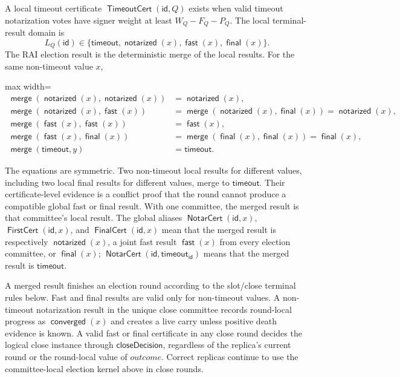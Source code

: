 \documentclass[sigplan,twocolumn,review,anonymous]{acmart}
\newcommand{\func}[1]{\operatorname{\mathsf{#1}}}
\newcommand{\NotarCert}{\func{NotarCert}}
\newcommand{\FirstCert}{\func{FirstCert}}
\newcommand{\FinalCert}{\func{FinalCert}}
\newcommand{\TimeoutCert}{\func{TimeoutCert}}
\newcommand{\id}{\mathsf{id}}
\newcommand{\closeDecision}{\mathsf{closeDecision}}
\newcommand{\timeoutVal}{\mathsf{timeout}}
\newcommand{\timeoutOutcome}{\mathsf{timeout}}
\newcommand{\notarized}{\func{notarized}}
\newcommand{\converged}{\func{converged}}
\newcommand{\fast}{\func{fast}}
\newcommand{\final}{\func{final}}
\begin{document}
A local timeout certificate \(\TimeoutCert(\id,Q)\) exists when valid timeout notarization votes have
signer weight at least \(W_Q-F_Q-P_Q\).  The local terminal-result domain is
\[
L_Q(\id)\in\{\timeoutOutcome,\notarized(x),\fast(x),\final(x)\}.
\]
The RAI election result is the deterministic merge of the local results.  For the same non-timeout
value \(x\),
\begin{center}
\begin{adjustbox}{max width=\columnwidth}
\(\displaystyle
\begin{aligned}
\func{merge}(\notarized(x),\notarized(x))&=\notarized(x),\\
\func{merge}(\notarized(x),\fast(x))&=\func{merge}(\notarized(x),\final(x))=\notarized(x),\\
\func{merge}(\fast(x),\fast(x))&=\fast(x),\\
\func{merge}(\fast(x),\final(x))&=\func{merge}(\final(x),\final(x))=\final(x),\\
\func{merge}(\timeoutOutcome,y)&=\timeoutOutcome.
\end{aligned}
\)
\end{adjustbox}
\end{center}
The equations are symmetric.  Two non-timeout local results for different values, including two local
final results for different values, merge to \(\timeoutOutcome\).  Their certificate-level evidence is a
conflict proof that the round cannot produce a compatible global fast or final result.  With one
committee, the merged result is that committee's local result.  The global aliases
\(\NotarCert(\id,x)\), \(\FirstCert(\id,x)\), and \(\FinalCert(\id,x)\) mean that the merged result
is respectively \(\notarized(x)\), a joint fast result \(\fast(x)\) from every election committee, or
\(\final(x)\); \(\NotarCert(\id,\timeoutVal_\id)\) means that the merged result is
\(\timeoutOutcome\).

A merged result finishes an election round according to the slot/close terminal rules below.
Fast and final results are valid only for non-timeout values.  A non-timeout notarization result in the
unique close committee records round-local progress as \(\converged(x)\) and creates a live
carry unless positive death evidence is known.  A valid fast or final certificate in any close round
decides the logical close instance through \(\closeDecision\), regardless of the replica's current
round or the round-local value of \(outcome\).  Correct replicas continue to use the committee-local
election kernel above in close rounds.
\end{document}

